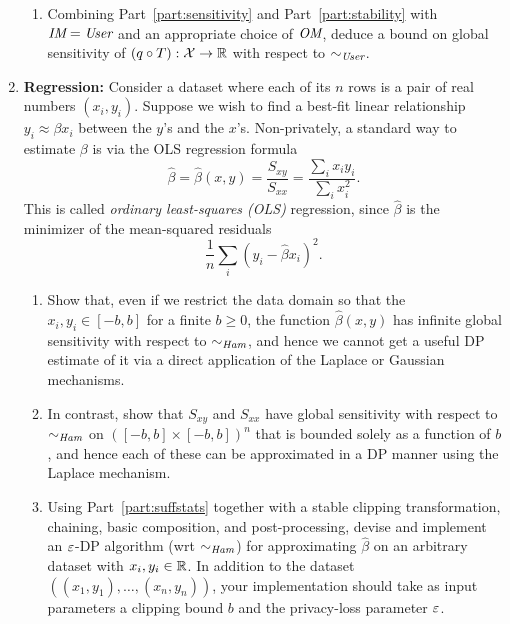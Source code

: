 \documentclass[11pt]{article}
\begin{document}
\begin{enumerate}[leftmargin=*]
\begin{enumerate}
\item Combining Part~\ref{part:sensitivity} and Part~\ref{part:stability} with $\textit{IM}=\textit{User}$ and an appropriate choice of $\textit{OM}$, deduce a bound on global sensitivity of $(q\circ T) : \mathcal{X}\rightarrow \mathbb{R}$ with respect to $\sim_{\textit{User}}$.
\end{enumerate}

\item \textbf{Regression: } 
Consider a dataset where each of its $n$ rows is a pair of real numbers $(x_i,y_i)$.  Suppose we wish to find a best-fit linear relationship $y_i \approx \beta x_i$ between the $y$'s and the $x$'s.  Non-privately, a standard way to estimate $\beta$ is via the OLS regression formula 
$$\hat{\beta} = \hat{\beta}(x,y) =  \frac{S_{xy}}{S_{xx}}
= \frac{\sum_i x_iy_i}{\sum_i x_i^2}.$$
This is called {\em ordinary least-squares (OLS)} regression, since $\hat{\beta}$ is the minimizer of the mean-squared residuals 
\begin{equation} \label{eqn:residuals}
    \frac{1}{n} \sum_i (y_i -\hat{\beta} x_i)^2.
\end{equation}

\begin{enumerate}
    \item Show that, even if we restrict the data domain so that the $x_i,y_i\in [-b,b]$ for a finite $b\geq 0$, the function $\hat{\beta}(x,y)$ has infinite global sensitivity with respect to $\sim_{\textit{Ham}}$,
    and hence we cannot get a useful DP estimate of it via a direct application of the Laplace or Gaussian mechanisms.
    \item In contrast, show that $S_{xy}$ and $S_{xx}$ have global sensitivity with respect to $\sim_{\textit{Ham}}$ on $([-b,b]\times [-b,b])^n$ that is bounded solely as a function of $b$, and hence each of these can be approximated in a DP manner using the Laplace mechanism. \label{part:suffstats}
    \item Using Part~\ref{part:suffstats} together with a stable clipping transformation, chaining,  
    basic composition, and post-processing,  devise and implement an $\varepsilon$-DP algorithm (wrt $\sim_{\textit{Ham}}$)  for approximating $\hat{\beta}$ on an arbitrary dataset with $x_i,y_i\in \mathbb{R}$.  
    In addition to the dataset $((x_1,y_1),\ldots,(x_n,y_n))$, your implementation should take as input parameters a clipping bound $b$ and the privacy-loss parameter $\varepsilon$.
    

\end{enumerate}
\end{enumerate}
\end{document}
